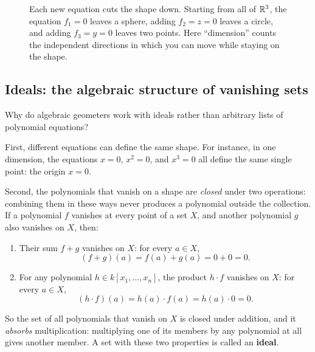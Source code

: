 \begin{figure}[htbp]
\caption{Each new equation cuts the shape down. Starting from all of $\mathbb{R}^3$, the equation $f_1 = 0$ leaves a sphere, adding $f_2 = z = 0$ leaves a circle, and adding $f_3 = y = 0$ leaves two points. Here ``dimension'' counts the independent directions in which you can move while staying on the shape.}
\label{24:fig-adding-equations}
\end{figure}

\subsection{Ideals: the algebraic structure of vanishing sets}

Why do algebraic geometers work with ideals rather than arbitrary lists of polynomial equations?

First, different equations can define the same shape. For instance, in one dimension, the equations $x = 0$, $x^2 = 0$, and $x^3 = 0$ all define the same single point: the origin $x = 0$.

Second, the polynomials that vanish on a shape are \emph{closed} under two operations: combining them in these ways never produces a polynomial outside the collection. If a polynomial $f$ vanishes at every point of a set $X$, and another polynomial $g$ also vanishes on $X$, then:
\begin{enumerate}
\item Their sum $f + g$ vanishes on $X$: for every $a \in X$,
\[
(f + g)(a) = f(a) + g(a) = 0 + 0 = 0.
\]
\item For any polynomial $h \in k[x_1, \dots, x_n]$, the product $h \cdot f$ vanishes on $X$: for every $a \in X$,
\[
(h \cdot f)(a) = h(a) \cdot f(a) = h(a) \cdot 0 = 0.
\]
\end{enumerate}
So the set of all polynomials that vanish on $X$ is closed under addition, and it \emph{absorbs} multiplication: multiplying one of its members by any polynomial at all gives another member. A set with these two properties is called an \textbf{ideal}.

